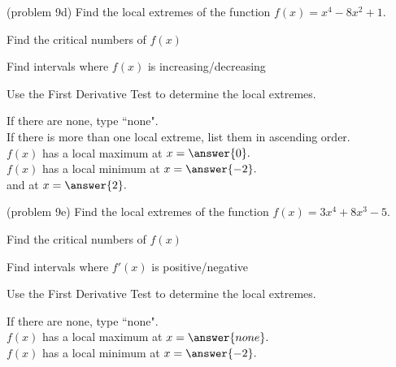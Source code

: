 \documentclass{ximera}
\begin{document}
\begin{problem}(problem 9d)
Find the local extremes of the function $f(x) = x^4 - 8x^2 + 1.$
\begin{hint}
Find the critical numbers of $f(x)$
\end{hint}
\begin{hint}
Find intervals where $f(x)$ is increasing/decreasing
\end{hint}
\begin{hint}
Use the First Derivative Test to determine the local extremes.
\end{hint}

If there are none, type ``none".\\
If there is more than one local extreme, list them in ascending order.\\
$f(x)$ has a local maximum at $x = \answer{0}.$\\
$f(x)$ has a local minimum at $x = \answer{-2}.$\\
and at $x = \answer{2}.$
\end{problem}


\begin{problem}(problem 9e)
Find the local extremes of the function $f(x) = 3x^4 +8x^3 - 5.$\\
\begin{hint}
Find the critical numbers of $f(x)$
\end{hint}
\begin{hint}
Find intervals where $f'(x)$ is positive/negative
\end{hint}
\begin{hint}
Use the First Derivative Test to determine the local extremes.
\end{hint}

If there are none, type ``none".\\
$f(x)$ has a local maximum at $x = \answer{none}.$\\
$f(x)$ has a local minimum at $x = \answer{-2}.$
\end{problem}
\end{document}
